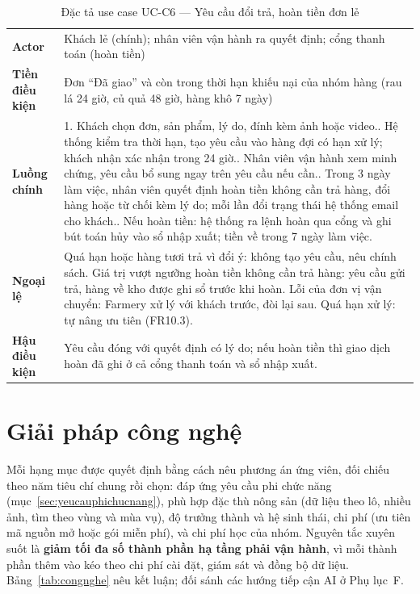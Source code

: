 \begingroup
\tblsetup
\begin{longtable}{L{3.00cm} L{12.25cm}}
\caption{Đặc tả use case UC-C6 --- Yêu cầu đổi trả, hoàn tiền đơn lẻ}
\label{tab:uc-c6} \\
\toprule
{}
 \\
\midrule
\endfirsthead
\bottomrule
\endfoot
\textbf{Actor} & Khách lẻ (chính); nhân viên vận hành ra quyết định; cổng thanh toán (hoàn tiền) \\
\textbf{Tiền điều kiện} & Đơn ``Đã giao'' và còn trong thời hạn khiếu nại của nhóm hàng (rau lá 24 giờ, củ quả 48 giờ, hàng khô 7 ngày) \\
\textbf{Luồng chính} &
1. Khách chọn đơn, sản phẩm, lý do, đính kèm ảnh hoặc video.. Hệ thống kiểm tra thời hạn, tạo yêu cầu vào hàng đợi có hạn xử lý; khách nhận xác nhận trong 24 giờ.. Nhân viên vận hành xem minh chứng, yêu cầu bổ sung ngay trên yêu cầu nếu cần.. Trong 3 ngày làm việc, nhân viên quyết định hoàn tiền không cần trả hàng, đổi hàng hoặc từ chối kèm lý do; mỗi lần đổi trạng thái hệ thống email cho khách.. Nếu hoàn tiền: hệ thống ra lệnh hoàn qua cổng và ghi bút toán hủy vào sổ nhập xuất; tiền về trong 7 ngày làm việc. \\
\textbf{Ngoại lệ} & Quá hạn hoặc hàng tươi trả vì đổi ý: không tạo yêu cầu, nêu chính sách. Giá trị vượt ngưỡng hoàn tiền không cần trả hàng: yêu cầu gửi trả, hàng về kho được ghi sổ trước khi hoàn. Lỗi của đơn vị vận chuyển: Farmery xử lý với khách trước, đòi lại sau. Quá hạn xử lý: tự nâng ưu tiên (FR10.3). \\
\textbf{Hậu điều kiện} & Yêu cầu đóng với quyết định có lý do; nếu hoàn tiền thì giao dịch hoàn đã ghi ở cả cổng thanh toán và sổ nhập xuất. \\
\end{longtable}
\endgroup

\section{Giải pháp công nghệ}
\label{sec:giaiphapcongnghe}

Mỗi hạng mục được quyết định bằng cách nêu phương án ứng viên, đối chiếu theo năm tiêu chí chung rồi chọn: đáp ứng yêu cầu phi chức năng (mục~\ref{sec:yeucauphichucnang}), phù hợp đặc thù nông sản (dữ liệu theo lô, nhiều ảnh, tìm theo vùng và mùa vụ), độ trưởng thành và hệ sinh thái, chi phí (ưu tiên mã nguồn mở hoặc gói miễn phí), và chi phí học của nhóm. Nguyên tắc xuyên suốt là \textbf{giảm tối đa số thành phần hạ tầng phải vận hành}, vì mỗi thành phần thêm vào kéo theo chi phí cài đặt, giám sát và đồng bộ dữ liệu. Bảng~\ref{tab:congnghe} nêu kết luận; đối sánh các hướng tiếp cận AI ở Phụ lục~F.

